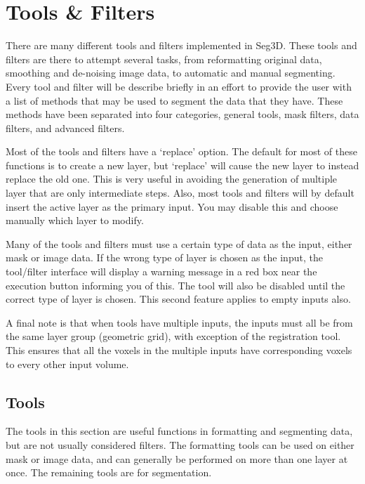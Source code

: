 \documentclass[fleqn,11pt,openany]{book}
\begin{document}



\chapter{Tools \& Filters}
\label{sec:tools_filters}

\begin{introduction}
 There are many different tools and filters implemented in Seg3D.  These tools and filters are there to attempt several tasks, from reformatting original data, smoothing and de-noising image data, to automatic and manual segmenting.  Every tool and filter will be describe briefly in an effort to provide the user with a list of methods that may be used to segment the data that they have.  These methods have been separated into four categories, general tools, mask filters, data filters, and advanced filters.
 
Most of the tools and filters have a `replace' option.  The default for most of these functions is to create a new layer, but `replace' will cause the new layer to instead replace the old one.  This is very useful in avoiding the generation of multiple layer that are only intermediate steps.  Also, most tools and filters will by default insert the active layer as the primary input.  You may disable this and choose manually which layer to modify.  

 Many of the tools and filters must use a certain type of data as the input, either mask or image data.  If the wrong type of layer is chosen as the input, the tool/filter interface will display a warning message in a red box near the execution button informing you of this.  The tool will also be disabled until the correct type of layer is chosen.  This second feature applies to empty inputs also.  

 A final note is that when tools have multiple inputs, the inputs must all be from the same layer group (geometric grid), with exception of the registration tool.  This ensures that all the voxels in the multiple inputs have corresponding voxels to every other input volume. 

\end{introduction}

\section{Tools}

The tools in this section are useful functions in formatting and segmenting data, but are not usually considered filters.  The formatting tools can be used on either mask or image data, and can generally be performed on more than one layer at once.  The remaining tools are for segmentation.  
\end{document}
